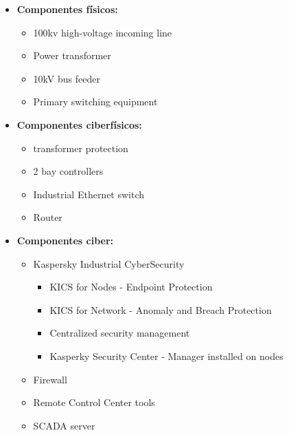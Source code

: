 \begin{itemize}
   \item \textbf{Componentes físicos:}
   \begin{itemize}
      \item 100kv high-voltage incoming line
      \item Power transformer
      \item 10kV bus feeder
      \item Primary switching equipment
   \end{itemize}
   \item \textbf{Componentes ciberfísicos:}
   \begin{itemize}
      \item transformer protection
      \item 2 bay controllers
      \item Industrial Ethernet switch
      \item Router
   \end{itemize}
   \item \textbf{Componentes ciber:}
   \begin{itemize}
      \item Kaspersky Industrial CyberSecurity
      \begin{itemize}
         \item KICS for Nodes - Endpoint Protection
         \item KICS for Network - Anomaly and Breach Protection
         \item Centralized security management
         \item Kasperky Security Center - Manager installed on nodes
      \end{itemize}
      \item Firewall
      \item Remote Control Center tools
      \item SCADA server
   \end{itemize}
\end{itemize}

